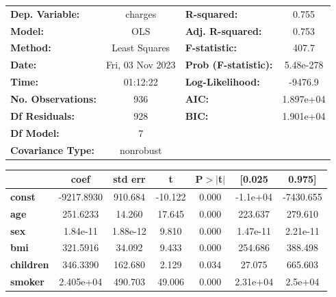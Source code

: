 \begin{center}
\begin{tabular}{lclc}
\toprule
\textbf{Dep. Variable:}    &     charges      & \textbf{  R-squared:         } &     0.755   \\
\textbf{Model:}            &       OLS        & \textbf{  Adj. R-squared:    } &     0.753   \\
\textbf{Method:}           &  Least Squares   & \textbf{  F-statistic:       } &     407.7   \\
\textbf{Date:}             & Fri, 03 Nov 2023 & \textbf{  Prob (F-statistic):} & 5.48e-278   \\
\textbf{Time:}             &     01:12:22     & \textbf{  Log-Likelihood:    } &   -9476.9   \\
\textbf{No. Observations:} &         936      & \textbf{  AIC:               } & 1.897e+04   \\
\textbf{Df Residuals:}     &         928      & \textbf{  BIC:               } & 1.901e+04   \\
\textbf{Df Model:}         &           7      & \textbf{                     } &             \\
\textbf{Covariance Type:}  &    nonrobust     & \textbf{                     } &             \\
\bottomrule
\end{tabular}
\begin{tabular}{lcccccc}
                           & \textbf{coef} & \textbf{std err} & \textbf{t} & \textbf{P$> |$t$|$} & \textbf{[0.025} & \textbf{0.975]}  \\
\midrule
\textbf{const}             &   -9217.8930  &      910.684     &   -10.122  &         0.000        &     -1.1e+04    &    -7430.655     \\
\textbf{age}               &     251.6233  &       14.260     &    17.645  &         0.000        &      223.637    &      279.610     \\
\textbf{sex}               &     1.84e-11  &     1.88e-12     &     9.810  &         0.000        &     1.47e-11    &     2.21e-11     \\
\textbf{bmi}               &     321.5916  &       34.092     &     9.433  &         0.000        &      254.686    &      388.498     \\
\textbf{children}          &     346.3390  &      162.680     &     2.129  &         0.034        &       27.075    &      665.603     \\
\textbf{smoker}            &    2.405e+04  &      490.703     &    49.006  &         0.000        &     2.31e+04    &      2.5e+04     \\

\end{tabular}
\end{center}
